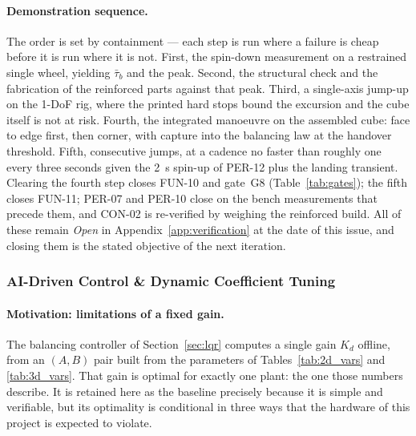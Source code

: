 \paragraph{Demonstration sequence.} The order is set by containment --- each
step is run where a failure is cheap before it is run where it is not. First,
the spin-down measurement on a restrained single wheel, yielding $\bar\tau_b$
and the peak. Second, the structural check and the fabrication of the reinforced
parts against that peak. Third, a single-axis jump-up on the 1-DoF rig, where
the printed hard stops bound the excursion and the cube itself is not at risk.
Fourth, the integrated manoeuvre on the assembled cube: face to edge first, then
corner, with capture into the balancing law at the handover threshold. Fifth,
consecutive jumps, at a cadence no faster than roughly one every three seconds
given the \qty{2}{\second} spin-up of PER-12 plus the landing transient. Clearing
the fourth step closes FUN-10 and gate~G8 (Table~\ref{tab:gates}); the fifth
closes FUN-11; PER-07 and PER-10 close on the bench measurements that precede
them, and CON-02 is re-verified by weighing the reinforced build. All of these
remain \emph{Open} in Appendix~\ref{app:verification} at the date of this issue,
and closing them is the stated objective of the next iteration.

\subsubsection{AI-Driven Control \& Dynamic Coefficient Tuning}
\label{sec:ai_control}

\paragraph{Motivation: limitations of a fixed gain.} The balancing controller of Section~\ref{sec:lqr} computes a single
gain $K_d$ offline, from an $(A,B)$ pair built from the parameters of
Tables~\ref{tab:2d_vars} and \ref{tab:3d_vars}. That gain is optimal for
exactly one plant: the one those numbers describe. It is retained here as the
baseline precisely because it is simple and verifiable, but its optimality is
conditional in three ways that the hardware of this project is expected to
violate.

